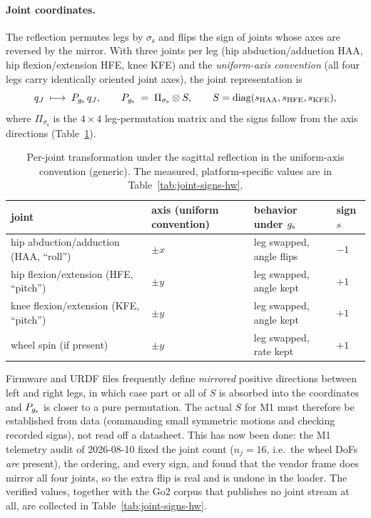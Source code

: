 \paragraph{Joint coordinates.}
The reflection permutes legs by $\sigma_{\mathrm{s}}$ and flips the sign of
joints whose axes are reversed by the mirror. With three joints per leg
(hip abduction/adduction HAA, hip flexion/extension HFE, knee KFE) and the
\emph{uniform-axis convention} (all four legs carry identically oriented joint
axes), the joint representation is
\begin{equation}
  \label{eq:joint-action}
  q_J \;\longmapsto\; P_{g_{\mathrm{s}}}\, q_J,
  \qquad
  P_{g_{\mathrm{s}}} \;=\; \Pi_{\sigma_{\mathrm{s}}} \otimes S,
  \qquad
  S = \operatorname{diag}(s_{\mathrm{HAA}}, s_{\mathrm{HFE}}, s_{\mathrm{KFE}}),
\end{equation}
where $\Pi_{\sigma_{\mathrm{s}}}$ is the $4\times4$ leg-permutation matrix and
the signs follow from the axis directions (Table~\ref{tab:joint-signs}).

\begin{table}[ht]
\centering
\small
\begin{tabular}{@{}llll@{}}
\toprule
joint & axis (uniform convention) & behavior under $g_{\mathrm{s}}$ & sign $s$ \\
\midrule
hip abduction/adduction (HAA, ``roll'')   & $\pm x$ & leg swapped, angle flips & $-1$ \\
hip flexion/extension (HFE, ``pitch'')    & $\pm y$ & leg swapped, angle kept  & $+1$ \\
knee flexion/extension (KFE, ``pitch'')   & $\pm y$ & leg swapped, angle kept  & $+1$ \\
wheel spin (if present)                   & $\pm y$ & leg swapped, rate kept   & $+1$ \\
\bottomrule
\end{tabular}
\caption{Per-joint transformation under the sagittal reflection in the
uniform-axis convention (generic). The measured, platform-specific values are
in Table~\ref{tab:joint-signs-hw}.}
\label{tab:joint-signs}
\end{table}

\begin{remark}
\label{rem:vendor-signs}
Firmware and URDF files frequently define \emph{mirrored} positive directions
between left and right legs, in which case part or all of $S$ is absorbed into
the coordinates and $P_{g_{\mathrm{s}}}$ is closer to a pure permutation. The actual $S$
for M1 must therefore be established from data (commanding small symmetric
motions and checking recorded signs), not read off a datasheet.
This has now been done: the M1 telemetry audit of 2026-08-10 fixed the joint
count ($n_j = 16$, i.e.\ the wheel DoFs \emph{are} present), the ordering, and
every sign, and found that the vendor frame does mirror all four joints, so the
extra flip is real and is undone in the loader. The verified values, together
with the Go2 corpus that publishes no joint stream at all, are collected in
Table~\ref{tab:joint-signs-hw}.
\end{remark}

